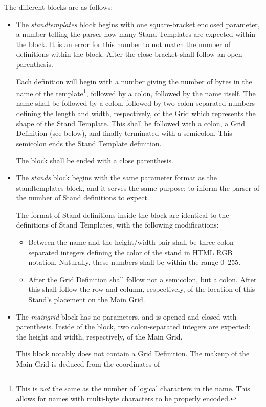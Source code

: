 \documentclass{report}
\begin{document}
The different blocks are as follows:
\begin{itemize}
	\item The \emph{standtemplates} block begins with one square-bracket
		enclosed parameter, a number telling the parser how many
		Stand Templates are expected within the block. It is an error
		for this number to not match the number of definitions within
		the block. After the close bracket shall follow an open
		parenthesis.

		Each definition will begin with a number giving the number of
		bytes in the name of the template\footnote{This is \emph{not}
			the same as the number of logical characters in the
			name. This allows for names with multi-byte characters
		to be properly encoded.}, followed by a colon,
		followed by the name itself. The name shall be followed by
		a colon, followed by two colon-separated numbers defining
		the length and width, respectively, of the Grid which
		represents the shape of the Stand Template. This shall be
		followed with a colon, a Grid Definition (see below), and
		finally terminated with a semicolon. This semicolon ends
		the Stand Template definition.

		The block shall be ended with a close parenthesis.
	\item The \emph{stands} block begins with the same parameter format as
		the standtemplates block, and it serves the same purpose:
		to inform the parser of the number of Stand definitions to
		expect.

		The format of Stand definitions inside the block are
		identical to the definitions of Stand Templates, with the
		following modifications:
		\begin{itemize}
			\item Between the name and the height/width pair
				shall be three colon-separated integers
				defining the color of the stand in
				HTML RGB notation. Naturally, these
				numbers shall be within the range 0--255.
			\item After the Grid Definition shall follow not a
				semicolon, but a colon. After this shall
				follow the row and column, respectively, of
				the location of this Stand's placement
				on the Main Grid.
		\end{itemize}
	\item The \emph{maingrid} block has no parameters, and is opened
		and closed with parenthesis. Inside of the
		block, two colon-separated integers are expected: the
		height and width, respectively, of the Main Grid.

		This block notably does not contain a Grid Definition. The
		makeup of the Main Grid is deduced from the coordinates of
\end{itemize}
\end{document}
